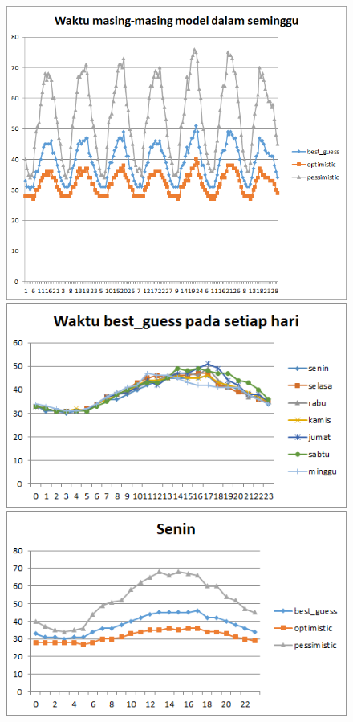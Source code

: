 \begin{figure}[H]
				\centering		
				\includegraphics[scale=0.7]{Gambar/waktuallmodelsampel117072017reverse.png}
				\includegraphics[]{Gambar/waktubestguesssampel117072017reverse.png}
				\includegraphics[]{Gambar/seninsampel117072017reverse.png}
\end{figure}
			
